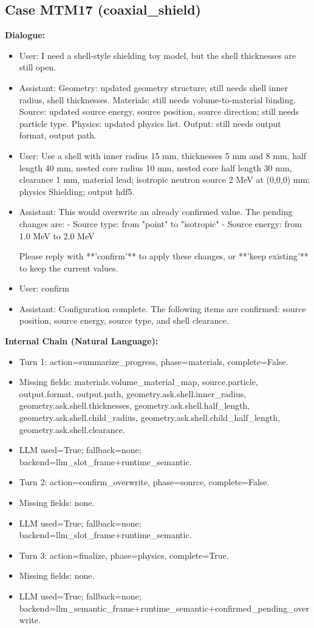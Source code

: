 \documentclass[11pt]{ctexart}
\begin{document}
\subsection{Case MTM17 (coaxial\_shield)}
\textbf{Dialogue:}
\begin{itemize}
\item User: I need a shell-style shielding toy model, but the shell thicknesses are still open.
\item Assistant: Geometry: updated geometry structure; still needs shell inner radius, shell thicknesses. Materials: still needs volume-to-material binding. Source: updated source energy, source position, source direction; still needs particle type. Physics: updated physics list. Output: still needs output format, output path.
\item User: Use a shell with inner radius 15 mm, thicknesses 5 mm and 8 mm, half length 40 mm, nested core radius 10 mm, nested core half length 30 mm, clearance 1 mm, material lead; isotropic neutron source 2 MeV at (0,0,0) mm; physics Shielding; output hdf5.
\item Assistant: This would overwrite an already confirmed value. The pending changes are:
- Source type: from "point" to "isotropic"
- Source energy: from 1.0 MeV to 2.0 MeV

Please reply with **'confirm'** to apply these changes, or **'keep existing'** to keep the current values.
\item User: confirm
\item Assistant: Configuration complete. The following items are confirmed: source position, source energy, source type, and shell clearance.
\end{itemize}
\textbf{Internal Chain (Natural Language):}
\begin{itemize}
\item Turn 1: action=summarize\_progress, phase=materials, complete=False.
\item Missing fields: materials.volume\_material\_map, source.particle, output.format, output.path, geometry.ask.shell.inner\_radius, geometry.ask.shell.thicknesses, geometry.ask.shell.half\_length, geometry.ask.shell.child\_radius, geometry.ask.shell.child\_half\_length, geometry.ask.shell.clearance.
\item LLM used=True; fallback=none; backend=llm\_slot\_frame+runtime\_semantic.
\item Turn 2: action=confirm\_overwrite, phase=source, complete=False.
\item Missing fields: none.
\item LLM used=True; fallback=none; backend=llm\_slot\_frame+runtime\_semantic.
\item Turn 3: action=finalize, phase=physics, complete=True.
\item Missing fields: none.
\item LLM used=True; fallback=none; backend=llm\_semantic\_frame+runtime\_semantic+confirmed\_pending\_overwrite.
\end{itemize}
\end{document}
